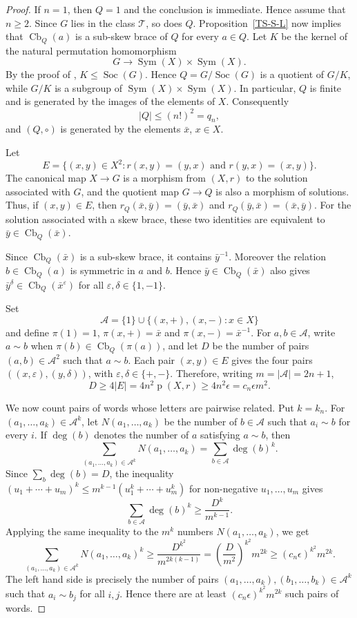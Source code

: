 \documentclass[11pt, oneside]{amsart}
\numberwithin{equation}{section}
\theoremstyle{plain}
\theoremstyle{definition}
\newcommand{\Cb}{\operatorname{Cb} }
\newcommand{\Soc}{\operatorname{Soc} }
\begin{document}
\begin{proof}
 If $n=1$, then $Q=1$ and the conclusion is immediate. Hence assume that $n\geqslant2$.
 Since $G$ lies in the class $\mathcal{T}$, so does $Q$. Proposition~\ref{TS-S-L} now implies that $\Cb_Q(a)$ is a sub-skew brace of $Q$ for every $a\in Q$.
Let $K$ be the kernel of the natural permutation homomorphism
$$
G\longrightarrow \operatorname{Sym}(X)\times\operatorname{Sym}(X).
$$
By the proof of \cite[Theorem~3.11]{Bac18}, $K\leqslant\Soc(G)$. Hence $Q=G/\Soc(G)$ is a quotient of $G/K$, while $G/K$ is a subgroup of
$\operatorname{Sym}(X)\times\operatorname{Sym}(X)$. In particular, $Q$ is finite and is generated by
the images of the elements of $X$. Consequently
$$
|Q|\leqslant(n!)^2=q_n,
$$
and  $(Q, \circ)$ is generated by the elements
$\bar x$, $x\in X$.

Let
$$
E=\{(x,y)\in X^2:r(x,y)=(y,x)\text{ and }r(y,x)=(x,y)\}.
$$
The canonical map $X\to G$ is a morphism from $(X,r)$ to the solution
associated with $G$, and the quotient map $G\to Q$ is also a morphism of
solutions. Thus, if $(x,y)\in E$, then
$r_Q(\bar x,\bar y)=(\bar y,\bar x)$ and
$r_Q(\bar y,\bar x)=(\bar x,\bar y)$. For the solution associated with a
skew brace, these two identities are equivalent to
$\bar y\in\Cb_Q(\bar x)$.

Since $\Cb_Q(\bar x)$ is a sub-skew brace, it contains $\bar y^{-1}$.
Moreover the relation $b\in\Cb_Q(a)$ is symmetric in $a$ and $b$. Hence
$\bar y\in\Cb_Q(\bar x)$ also gives
$\bar y^{\delta}\in\Cb_Q(\bar x^{\varepsilon})$ for all
$\varepsilon,\delta\in\{1,-1\}$.


Set
$$
\mathcal A=\{1\}\cup\{(x,+),(x,-):x\in X\}
$$
and define $\pi(1)=1$, $\pi(x,+)=\bar x$ and
$\pi(x,-)=\bar x^{-1}$. For $a,b\in\mathcal A$, write $a\sim b$ when
$\pi(b)\in\Cb_Q(\pi(a))$, and let $D$ be the number of pairs
$(a,b)\in\mathcal A^2$ such that $a\sim b$. Each pair $(x,y)\in E$ gives
the four pairs $((x,\varepsilon),(y,\delta))$, with
$\varepsilon,\delta\in\{+,-\}$. Therefore, writing $m=|\mathcal A|=2n+1$,
$$
D\geqslant4|E|=4n^2\operatorname{p}(X,r)\geqslant4n^2\epsilon
=c_n\epsilon m^2.
$$

We now count pairs of words whose letters are pairwise related. Put $k=k_n$.
For $(a_1,\ldots,a_k)\in\mathcal A^k$, let
$N(a_1,\ldots,a_k)$ be the number of $b\in\mathcal A$ such that
$a_i\sim b$ for every $i$. If $\deg(b)$ denotes the number of $a$ satisfying
$a\sim b$, then
$$
\sum_{(a_1,\ldots,a_k)\in\mathcal A^k}N(a_1,\ldots,a_k)
=\sum_{b\in\mathcal A}\deg(b)^k.
$$
Since $\sum_b\deg(b)=D$, the inequality
$(u_1+\cdots+u_m)^k\leqslant m^{k-1}(u_1^k+\cdots+u_m^k)$ for non-negative
$u_1,\ldots,u_m$ gives
$$
\sum_{b\in\mathcal A}\deg(b)^k\geqslant\frac{D^k}{m^{k-1}}.
$$
Applying the same inequality to the $m^k$ numbers
$N(a_1,\ldots,a_k)$, we get
$$
\sum_{(a_1,\ldots,a_k)\in\mathcal A^k}N(a_1,\ldots,a_k)^k
\geqslant
\frac{D^{k^2}}{m^{2k(k-1)}}
=
\left(\frac{D}{m^2}\right)^{k^2}m^{2k}
\geqslant(c_n\epsilon)^{k^2}m^{2k}.
$$
The left hand side is precisely the number of pairs
$(a_1,\ldots,a_k),(b_1,\ldots,b_k)\in\mathcal A^k$ such that
$a_i\sim b_j$ for all $i,j$. Hence there are at least
$(c_n\epsilon)^{k^2}m^{2k}$ such pairs of words.


\end{proof}
\end{document}
